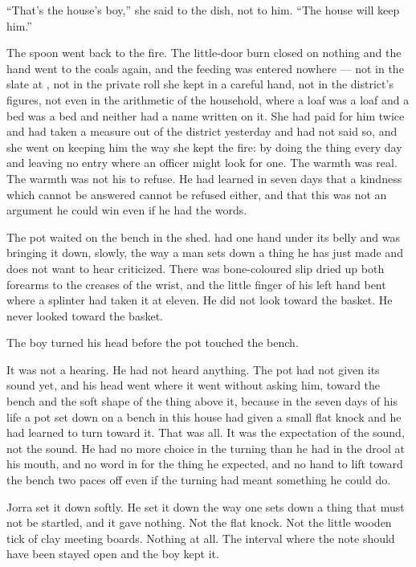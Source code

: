 “That's the house's boy,” she said to the dish, not to him. “The house will keep him.”

The spoon went back to the fire. The little-door burn closed on nothing and the hand went to the coals again, and the feeding was entered nowhere --- not in the slate at , not in the private roll she kept in a careful hand, not in the district's figures, not even in the arithmetic of the household, where a loaf was a loaf and a bed was a bed and neither had a name written on it. She had paid for him twice and had taken a measure out of the district yesterday and had not said so, and she went on keeping him the way she kept the fire: by doing the thing every day and leaving no entry where an officer might look for one. The warmth was real. The warmth was not his to refuse. He had learned in seven days that a kindness which cannot be answered cannot be refused either, and that this was not an argument he could win even if he had the words.

\scenebreak

The pot waited on the bench in the shed.  had one hand under its belly and was bringing it down, slowly, the way a man sets down a thing he has just made and does not want to hear criticized. There was bone-coloured slip dried up both forearms to the creases of the wrist, and the little finger of his left hand bent where a splinter had taken it at eleven. He did not look toward the basket. He never looked toward the basket.

The boy turned his head before the pot touched the bench.

It was not a hearing. He had not heard anything. The pot had not given its sound yet, and his head went where it went without asking him, toward the bench and the soft shape of the thing above it, because in the seven days of his life a pot set down on a bench in this house had given a small flat knock and he had learned to turn toward it. That was all. It was the expectation of the sound, not the sound. He had no more choice in the turning than he had in the drool at his mouth, and no word in  for the thing he expected, and no hand to lift toward the bench two paces off even if the turning had meant something he could do.

Jorra set it down softly. He set it down the way one sets down a thing that must not be startled, and it gave nothing. Not the flat knock. Not the little wooden tick of clay meeting boards. Nothing at all. The interval where the note should have been stayed open and the boy kept it.

